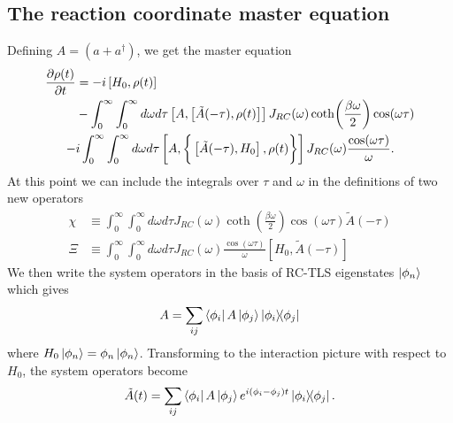 \documentclass[]{article}
\begin{document}
\subsection{The reaction coordinate master equation}
Defining $A= (a + a^{\dagger})$, we get the master equation
\begin{align}
	\begin{split}
		\label{eq:ReactionMasterExpansion4}
		\pdv{\rho(t)}{t} &= -i\left[H_0, \rho(t)\right]\\
		&-\int_{0}^{\infty}\int_{0}^{\infty}d\omega d\tau 
		\left[A,\left[\tilde{A}(-\tau),\rho(t) \right]\right] J_{RC}(\omega) \coth(\frac{\beta \omega}{2})\cos(\omega \tau)\\ 
		-& i\int_{0}^{\infty}\int_{0}^{\infty}d\omega d\tau\left[A ,\biggr\lbrace\left[\tilde{A}(-\tau),H_0\right],\rho(t) \biggr\rbrace \right] J_{RC}(\omega) \frac{\cos(\omega \tau)}{\omega}.
	\end{split}
\end{align}
At this point we can include the integrals over $\tau$ and $\omega$ in the definitions of two new operators
\begin{align}
	\label{eq:NewRCOperators}
	\chi &\equiv \int_{0}^{\infty}\int_{0}^{\infty}d\omega d\tau  J_{RC}(\omega) \coth(\frac{\beta \omega}{2})\cos(\omega \tau) \tilde{A}(-\tau)\\
	\Xi &\equiv \int_{0}^{\infty}\int_{0}^{\infty}d\omega d\tau  J_{RC}(\omega) \frac{\cos(\omega\tau)}{\omega} \left[H_0, \tilde{A}(-\tau)\right]
\end{align}
We then write the system operators in the basis of RC-TLS eigenstates $\ket{\phi_n}$ which gives
\begin{equation}
A = \sum_{ij}\bra{\phi_i}A\ket{\phi_j} \dyad{\phi_i}{\phi_j}
\end{equation}
where $H_0\ket{\phi_n} = \phi_n\ket{\phi_n}$. Transforming to the interaction picture with respect to $H_0$, the system operators become
\begin{equation}
\tilde{A}(t) = \sum_{ij}\bra{\phi_i}A\ket{\phi_j} e^{i(\phi_i-\phi_j)t}\dyad{\phi_i}{\phi_j}.
\end{equation}
\end{document}
